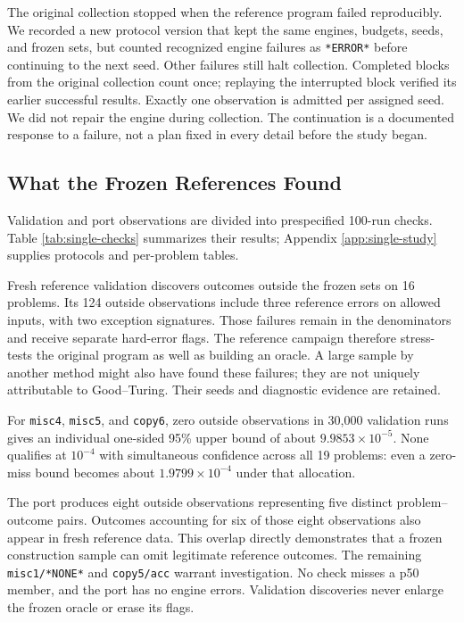 \documentclass[10pt,letterpaper]{article}
\begin{document}
The original collection stopped when the reference program failed reproducibly. We
recorded a new protocol version that kept the same engines, budgets, seeds, and frozen
sets, but counted recognized engine failures as \texttt{*ERROR*} before continuing to the
next seed. Other failures still halt collection. Completed blocks from the original
collection count once; replaying the interrupted block verified its earlier successful
results. Exactly one observation is admitted per assigned seed. We did not repair the
engine during collection. The continuation is a documented response to a failure, not a
plan fixed in every detail before the study began.

\subsection{What the Frozen References Found}\label{sec:single-results}

Validation and port observations are divided into prespecified 100-run checks. Table
\ref{tab:single-checks} summarizes their results; Appendix \ref{app:single-study} supplies
protocols and per-problem tables.



Fresh reference validation discovers outcomes outside the frozen sets on 16 problems. Its
124 outside observations include three reference errors on allowed inputs, with two
exception signatures. Those failures remain in the denominators and receive separate
hard-error flags. The reference campaign therefore stress-tests the original program as
well as building an oracle. A large sample by another method might also have found these
failures; they are not uniquely attributable to Good--Turing. Their seeds and diagnostic
evidence are retained.

For \texttt{misc4}, \texttt{misc5}, and \texttt{copy6}, zero outside observations in
30,000 validation runs gives an individual one-sided 95\% upper bound of about
\(9.9853\times10^{-5}\). None qualifies at \(10^{-4}\) with simultaneous confidence across
all 19 problems: even a zero-miss bound becomes about \(1.9799\times10^{-4}\) under that
allocation.

The port produces eight outside observations representing five distinct problem--outcome
pairs. Outcomes accounting for six of those eight observations also appear in fresh
reference data. This overlap directly demonstrates that a frozen construction sample can
omit legitimate reference outcomes. The remaining \texttt{misc1/*NONE*} and
\texttt{copy5/acc} warrant investigation. No check misses a p50 member, and the port has
no engine errors. Validation discoveries never enlarge the frozen oracle or erase its
flags.
\end{document}
